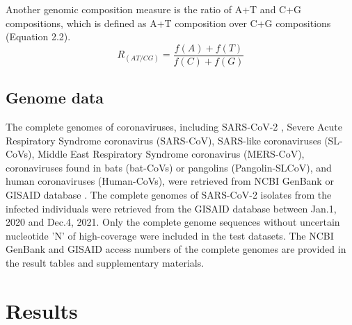 \documentclass{article}
\numberwithin{equation}{section}
\begin{document}
Another genomic composition measure is the ratio of A+T and C+G compositions, which is defined as A+T composition over C+G compositions (Equation 2.2).
\begin{equation}
R_{(AT/CG)}  = \frac{{f(A) + f(T)}}{{f(C) + f(G)}}
\end{equation}

\subsection{Genome data}
The complete genomes of coronaviruses, including SARS-CoV-2 \citep{wu2020new}, Severe Acute Respiratory Syndrome coronavirus (SARS-CoV), SARS-like coronaviruses (SL-CoVs), Middle East Respiratory Syndrome coronavirus (MERS-CoV), coronaviruses found in bats (bat-CoVs) or pangolins (Pangolin-SLCoV), and human coronaviruses (Human-CoVs), were retrieved from NCBI GenBank or GISAID database \citep{shu2017gisaid}. The complete genomes of SARS-CoV-2 isolates from the infected individuals were retrieved from the GISAID database between Jan.1, 2020 and Dec.4, 2021. Only the complete genome sequences without uncertain nucleotide 'N' of high-coverage were included in the test datasets. The NCBI GenBank and GISAID access numbers of the complete genomes are provided in the result tables and supplementary materials. 

\section{Results}
\end{document}
